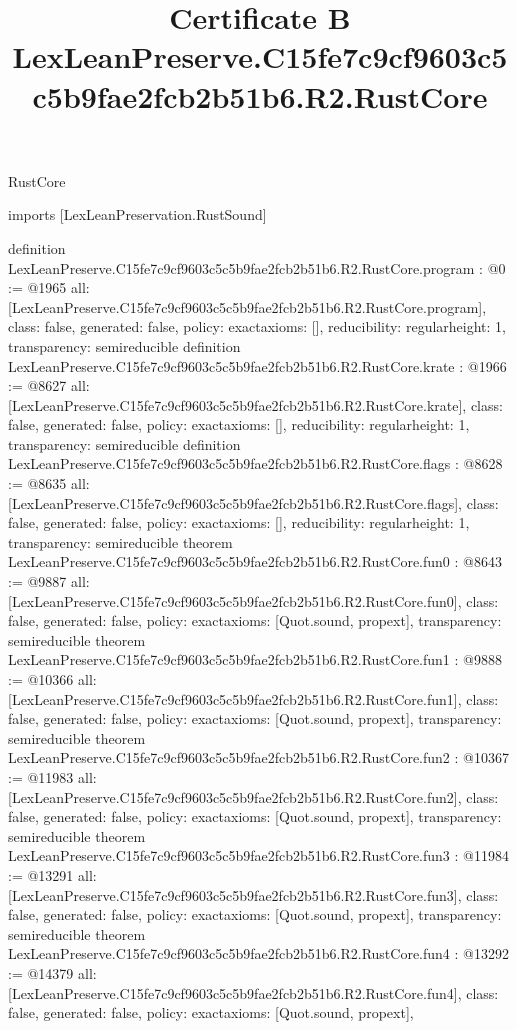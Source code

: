 \begin{lexlean}{RustCore}
\title{Certificate B LexLeanPreserve.C15fe7c9cf9603c5c5b9fae2fcb2b51b6.R2.RustCore}
\begin{coremodule}
imports [LexLeanPreservation.RustSound]

definition LexLeanPreserve.C15fe7c9cf9603c5c5b9fae2fcb2b51b6.R2.RustCore.program : @0 := @1965 {
  all: [LexLeanPreserve.C15fe7c9cf9603c5c5b9fae2fcb2b51b6.R2.RustCore.program],
  class: false,
  generated: false,
  policy: exact{axioms: []},
  reducibility: regular{height: 1},
  transparency: semireducible
}
definition LexLeanPreserve.C15fe7c9cf9603c5c5b9fae2fcb2b51b6.R2.RustCore.krate : @1966 := @8627 {
  all: [LexLeanPreserve.C15fe7c9cf9603c5c5b9fae2fcb2b51b6.R2.RustCore.krate],
  class: false,
  generated: false,
  policy: exact{axioms: []},
  reducibility: regular{height: 1},
  transparency: semireducible
}
definition LexLeanPreserve.C15fe7c9cf9603c5c5b9fae2fcb2b51b6.R2.RustCore.flags : @8628 := @8635 {
  all: [LexLeanPreserve.C15fe7c9cf9603c5c5b9fae2fcb2b51b6.R2.RustCore.flags],
  class: false,
  generated: false,
  policy: exact{axioms: []},
  reducibility: regular{height: 1},
  transparency: semireducible
}
theorem LexLeanPreserve.C15fe7c9cf9603c5c5b9fae2fcb2b51b6.R2.RustCore.fun0 : @8643 := @9887 {
  all: [LexLeanPreserve.C15fe7c9cf9603c5c5b9fae2fcb2b51b6.R2.RustCore.fun0],
  class: false,
  generated: false,
  policy: exact{axioms: [Quot.sound, propext]},
  transparency: semireducible
}
theorem LexLeanPreserve.C15fe7c9cf9603c5c5b9fae2fcb2b51b6.R2.RustCore.fun1 : @9888 := @10366 {
  all: [LexLeanPreserve.C15fe7c9cf9603c5c5b9fae2fcb2b51b6.R2.RustCore.fun1],
  class: false,
  generated: false,
  policy: exact{axioms: [Quot.sound, propext]},
  transparency: semireducible
}
theorem LexLeanPreserve.C15fe7c9cf9603c5c5b9fae2fcb2b51b6.R2.RustCore.fun2 : @10367 := @11983 {
  all: [LexLeanPreserve.C15fe7c9cf9603c5c5b9fae2fcb2b51b6.R2.RustCore.fun2],
  class: false,
  generated: false,
  policy: exact{axioms: [Quot.sound, propext]},
  transparency: semireducible
}
theorem LexLeanPreserve.C15fe7c9cf9603c5c5b9fae2fcb2b51b6.R2.RustCore.fun3 : @11984 := @13291 {
  all: [LexLeanPreserve.C15fe7c9cf9603c5c5b9fae2fcb2b51b6.R2.RustCore.fun3],
  class: false,
  generated: false,
  policy: exact{axioms: [Quot.sound, propext]},
  transparency: semireducible
}
theorem LexLeanPreserve.C15fe7c9cf9603c5c5b9fae2fcb2b51b6.R2.RustCore.fun4 : @13292 := @14379 {
  all: [LexLeanPreserve.C15fe7c9cf9603c5c5b9fae2fcb2b51b6.R2.RustCore.fun4],
  class: false,
  generated: false,
  policy: exact{axioms: [Quot.sound, propext]},
}
\end{coremodule}
\end{lexlean}
